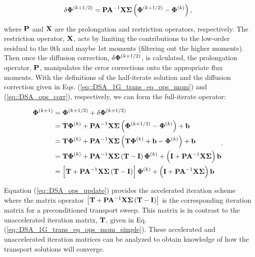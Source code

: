 \begin{equation}
\label{eq::DSA_ops_corr}
 \delta {\bf \Phi}^{(k+1/2)}  = {\bf P} {\bf A}^{-1} {\bf X} {\bf \Sigma} \left( {\bf \Phi}^{(k+1/2)} - {\bf \Phi}^{(k)}  \right) ,
\end{equation}

\noindent where ${\bf P}$ and ${\bf X}$ are the prolongation and restriction operators, respectively. The restriction operator, ${\bf X}$, acts by limiting the contributions to the low-order residual to the 0th and maybe 1st moments (filtering out the higher moments). Then once the diffusion correction, $\delta {\bf \Phi}^{(k+1/2)}$, is calculated, the prolongation operator, ${\bf P}$, manipulates the error corrections onto the appropriate flux moments. With the definitions of the half-iterate solution and the diffusion correction given in Eqs. (\ref{eq::DSA_1G_trans_eq_ops_mom}) and (\ref{eq::DSA_ops_corr}), respectively, we can form the full-iterate operator:

\begin{equation}
\label{eq::DSA_ops_update}
\begin{aligned}
{\bf \Phi}^{(k+1)} &= {\bf \Phi}^{(k+1/2)} + \delta {\bf \Phi}^{(k+1/2)} \\
&= {\bf T}  {\bf \Phi}^{(k)}  + {\bf P} {\bf A}^{-1} {\bf X} {\bf \Sigma} \left( {\bf \Phi}^{(k+1/2)} - {\bf \Phi}^{(k)}  \right)  +  {\bf b} \\
&= {\bf T}  {\bf \Phi}^{(k)}  + {\bf P} {\bf A}^{-1} {\bf X} {\bf \Sigma} \left(  {\bf T}  {\bf \Phi}^{(k)} +  {\bf b} - {\bf \Phi}^{(k)}  \right)  +  {\bf b}  \\
&= {\bf T}  {\bf \Phi}^{(k)}  + {\bf P} {\bf A}^{-1} {\bf X} {\bf \Sigma} \left(  {\bf T}    - {\bf I} \right)  {\bf \Phi}^{(k)} + \left( {\bf I}+ {\bf P} {\bf A}^{-1}  {\bf X} {\bf \Sigma}   \right) {\bf b} \\
&= \left[ {\bf T}  + {\bf P} {\bf A}^{-1} {\bf X} {\bf \Sigma} \left(  {\bf T}    - {\bf I} \right) \right] {\bf \Phi}^{(k)}  + \left({\bf I}+  {\bf P} {\bf A}^{-1}  {\bf X} {\bf \Sigma}  \right) {\bf b}
\end{aligned} .
\end{equation}

\noindent Equation (\ref{eq::DSA_ops_update}) provides the accelerated iteration scheme where the matrix operator $\left[ {\bf T}  + {\bf P} {\bf A}^{-1} {\bf X} {\bf \Sigma} \left(  {\bf T}    - {\bf I} \right) \right]$ is the corresponding iteration matrix for a preconditioned transport sweep. This matrix is in contrast to the unaccelerated iteration matrix, ${\bf T}$, given in Eq. (\ref{eq::DSA_1G_trans_eq_ops_mom_simple}). These accelerated and unaccelerated iteration matrices can be analyzed to obtain knowledge of how the transport solutions will converge.

